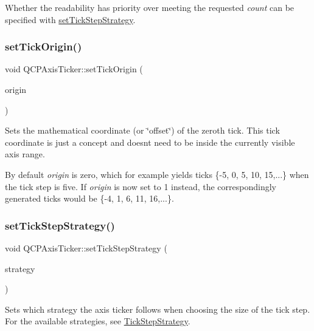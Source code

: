 Whether the readability has priority over meeting the requested {\itshape count} can be specified with \mbox{\hyperlink{class_q_c_p_axis_ticker_a73b1d847c1a12159af6bfda4ebebe7d5}{set\+Tick\+Step\+Strategy}}. \mbox{\label{class_q_c_p_axis_ticker_ab509c7e500293bf66a8409f0d7c23943}} 
\subsubsection{\texorpdfstring{setTickOrigin()}{setTickOrigin()}}
{\footnotesize\ttfamily void Q\+C\+P\+Axis\+Ticker\+::set\+Tick\+Origin (\begin{DoxyParamCaption}\item[{double}]{origin }\end{DoxyParamCaption})}

Sets the mathematical coordinate (or \char`\"{}offset\char`\"{}) of the zeroth tick. This tick coordinate is just a concept and doesn\textquotesingle{}t need to be inside the currently visible axis range.

By default {\itshape origin} is zero, which for example yields ticks \{-\/5, 0, 5, 10, 15,...\} when the tick step is five. If {\itshape origin} is now set to 1 instead, the correspondingly generated ticks would be \{-\/4, 1, 6, 11, 16,...\}. \mbox{\label{class_q_c_p_axis_ticker_a73b1d847c1a12159af6bfda4ebebe7d5}} 
\subsubsection{\texorpdfstring{setTickStepStrategy()}{setTickStepStrategy()}}
{\footnotesize\ttfamily void Q\+C\+P\+Axis\+Ticker\+::set\+Tick\+Step\+Strategy (\begin{DoxyParamCaption}\item[{\mbox{\hyperlink{class_q_c_p_axis_ticker_ab6d2f9d9477821623ac9bc4b21ddf49a}{Q\+C\+P\+Axis\+Ticker\+::\+Tick\+Step\+Strategy}}}]{strategy }\end{DoxyParamCaption})}

Sets which strategy the axis ticker follows when choosing the size of the tick step. For the available strategies, see \mbox{\hyperlink{class_q_c_p_axis_ticker_ab6d2f9d9477821623ac9bc4b21ddf49a}{Tick\+Step\+Strategy}}. \mbox{\label{class_q_c_p_axis_ticker_aaf9edbe4169ce55e216fd067cc139452}} 
